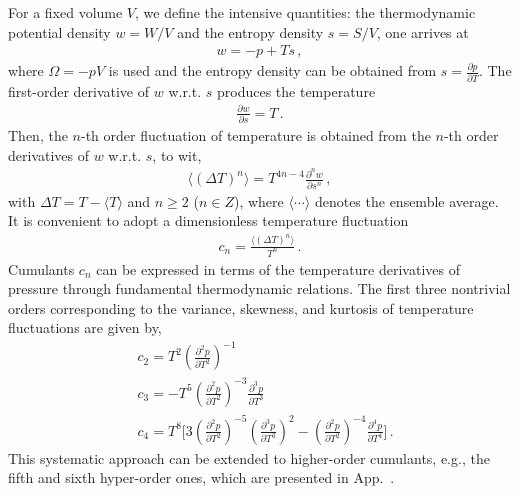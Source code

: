 \documentclass[aps,twocolumn,prd,superscriptaddress,nofootinbib,floatfix]{revtex4-2}
\def\app#1{App.~\labelcref{#1}}
\begin{document}
For a fixed volume $V$, we define the intensive quantities: the thermodynamic potential density $w=W/V$ and the entropy density $s=S/V$, one arrives at
\begin{align}
    w=-p+T s\,, \label{}
\end{align}
where $\Omega=-pV$ is used and the entropy density can be obtained from $s=\frac{\partial p}{\partial T}$. The first-order derivative of $w$ w.r.t. $s$ produces the temperature
\begin{align}
    \frac{\partial w}{\partial s}=T\,. \label{}
\end{align}
Then, the $n$-th order fluctuation of temperature is obtained from the $n$-th order derivatives of $w$ w.r.t. $s$, to wit,
\begin{align}
    \langle(\Delta T)^n \rangle=T^{4n-4}\frac{\partial^n w}{\partial s^n}\,, \label{eq:DeltaTn}
\end{align}
with $\Delta T=T-\langle T \rangle$ and $n\geq 2$ ($n \in Z$), where $\langle \cdots \rangle$ denotes the ensemble average. It is convenient to adopt a dimensionless temperature fluctuation
\begin{align}
    c_n=\frac{\langle(\Delta T)^n \rangle}{T^n}\,. \label{eq:cn}
\end{align}
Cumulants $c_n$ can be expressed in terms of the temperature derivatives of pressure through fundamental thermodynamic relations. The first three nontrivial orders corresponding to the variance, skewness, and kurtosis of temperature fluctuations are given by,
\begin{equation}\label{eq:c234}\begin{split}
    & c_2=T^2\left(\frac{\partial^2 p}{\partial T^2}\right)^{-1}\,\\[2ex]
    & c_3=-T^5\left(\frac{\partial^2 p}{\partial T^2}\right)^{-3}\frac{\partial^3 p}{\partial T^3}\,\\[2ex]
    & c_4=T^8\Bigg[3\left(\frac{\partial^2 p}{\partial T^2}\right)^{-5}\left(\frac{\partial^3 p}{\partial T^3}\right)^2-\left(\frac{\partial^2 p}{\partial T^2}\right)^{-4}\frac{\partial^4 p}{\partial T^4}\Bigg]\,.
\end{split} 
\end{equation}
This systematic approach can be extended to higher-order cumulants, e.g., the fifth and sixth hyper-order ones, which are presented in \app{app:hyper-order}.
\end{document}
